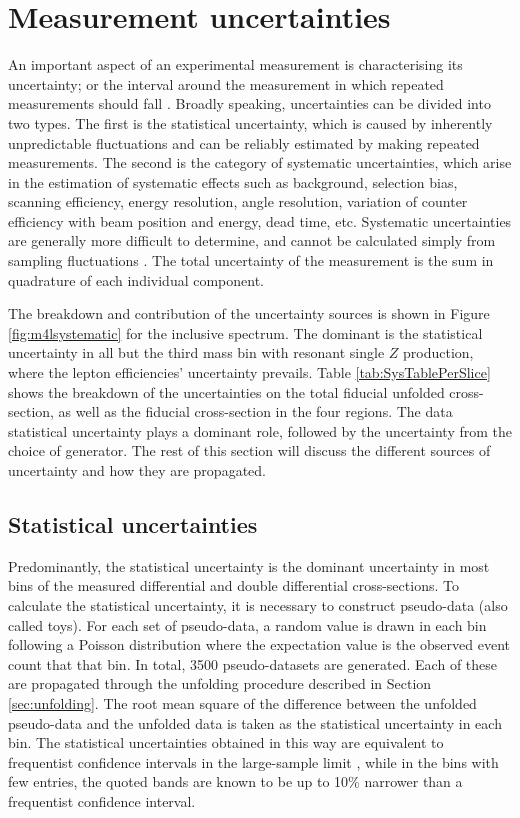 \section{Measurement uncertainties}
\label{sec:uncertainties}
An important aspect of an experimental measurement is characterising its uncertainty; or the interval around the measurement in which repeated measurements should fall \cite{Kar:ab1be6}. Broadly speaking, uncertainties can be divided into two types. The first is the statistical uncertainty, which is caused by inherently unpredictable fluctuations and can be reliably estimated by making repeated measurements. The second is the category of systematic uncertainties, which arise in the estimation of systematic effects such as background, selection bias, scanning efficiency, energy resolution, angle resolution, variation of counter efficiency with beam position and energy, dead time, etc\cite{orear}. Systematic uncertainties are generally more difficult to determine, and cannot be calculated simply from sampling fluctuations \cite{reygers}. The total uncertainty of the measurement is the sum in quadrature of each individual component.

The breakdown and contribution of the uncertainty sources is shown in Figure \ref{fig:m4lsystematic} for the inclusive \mFourL spectrum. The dominant is the statistical uncertainty in all but the third mass bin with resonant single $Z$ production, where the lepton efficiencies' uncertainty prevails. Table \ref{tab:SysTablePerSlice} shows the breakdown of the uncertainties on the total fiducial unfolded cross-section, as well as the fiducial cross-section in the four \mFourL regions. The data statistical uncertainty plays a dominant role, followed by the uncertainty from the choice of generator. The rest of this section will discuss the different sources of uncertainty and how they are propagated.

\subsection{Statistical uncertainties} \label{ssec:statuncert}

Predominantly, the statistical uncertainty is the dominant uncertainty in most bins of the measured differential and double differential cross-sections. To calculate the statistical uncertainty, it is necessary to construct pseudo-data (also called toys). For each set of pseudo-data, a random value is drawn in each bin following a Poisson distribution where the expectation value is the observed event count that that bin. In total, 3500 pseudo-datasets are generated. Each of these are propagated through the unfolding procedure described in Section \ref{sec:unfolding}. The root mean square of the difference between the unfolded pseudo-data and the unfolded data is taken as the statistical uncertainty in each bin. The statistical uncertainties obtained in this way are equivalent to frequentist confidence intervals in the large-sample limit  , while in the bins with few entries, the quoted bands are known to be up to 10\% narrower than a frequentist confidence interval.

